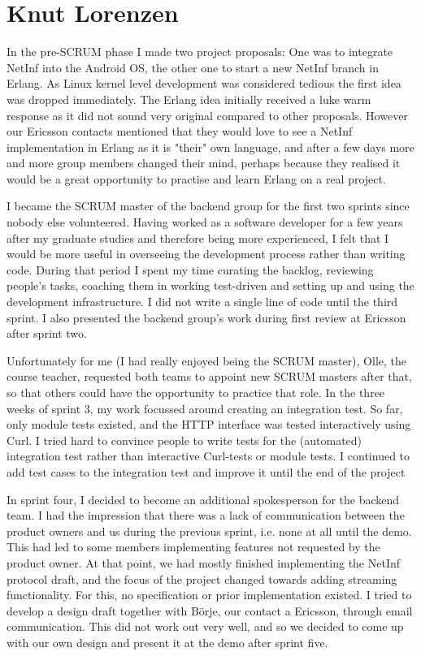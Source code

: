 \section{Knut Lorenzen}

In the pre-SCRUM phase I made two project proposals: One was to integrate NetInf into the Android OS, the other one to start a new NetInf branch in Erlang. As Linux kernel level development was considered tedious the first idea was dropped immediately. The Erlang idea initially received a luke warm response as it did not sound very original compared to other proposals. However our Ericsson contacts mentioned that they would love to see a NetInf implementation in Erlang as it is "their" own language, and after a few days more and more group members changed their mind, perhaps because they realised it would be a great opportunity to practise and learn Erlang on a real project.

I became the SCRUM master of the backend group for the first two sprints since nobody else volunteered. Having worked as a software developer for a few years after my graduate studies and therefore being more experienced, I felt that I would be more useful in overseeing the development process rather than writing code. During that period I spent my time curating the backlog, reviewing people's tasks, coaching them in working test-driven and setting up and using the development infrastructure. I did not write a single line of code until the third sprint. I also presented the backend group's work during first review at Ericsson after sprint two.

Unfortunately for me (I had really enjoyed being the SCRUM master), Olle, the course teacher, requested both teams to appoint new SCRUM masters after that, so that others could have the opportunity to practice that role. In the three weeks of sprint 3, my work focussed around creating an integration test. So far, only module tests existed, and the HTTP interface was tested interactively using Curl. I tried hard to convince people to write tests for the (automated) integration test rather than interactive Curl-tests or module tests. I continued to add test cases to the integration test and improve it until the end of the project

In sprint four, I decided to become an additional spokesperson for the backend team. I had the impression that there was a lack of communication between the product owners and us during the previous sprint, i.e. none at all until the demo. This had led to some members implementing features not requested by the product owner. At that point, we had mostly finished implementing the NetInf protocol draft, and the focus of the project changed towards adding streaming functionality. For this, no specification or prior implementation existed. I tried to develop a design draft together with B\"orje, our contact a Ericsson, through email communication. This did not work out very well, and so we decided to come up with our own design and present it at the demo after sprint five.
